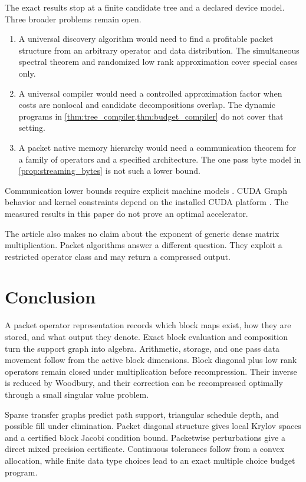 The exact results stop at a finite candidate tree and a declared device model. Three broader problems remain open.

\begin{enumerate}
\item A universal discovery algorithm would need to find a profitable packet structure from an arbitrary operator and data distribution. The simultaneous spectral theorem and randomized low rank approximation cover special cases only.
\item A universal compiler would need a controlled approximation factor when costs are nonlocal and candidate decompositions overlap. The dynamic programs in \cref{thm:tree_compiler,thm:budget_compiler} do not cover that setting.
\item A packet native memory hierarchy would need a communication theorem for a family of operators and a specified architecture. The one pass byte model in \cref{prop:streaming_bytes} is not such a lower bound.
\end{enumerate}

Communication lower bounds require explicit machine models \cite{HongKung1981,BallardDemmelHoltzSchwartz2011}. CUDA Graph behavior and kernel constraints depend on the installed CUDA platform \cite{NVIDIA2026}. The measured results in this paper do not prove an optimal accelerator.

The article also makes no claim about the exponent of generic dense matrix multiplication. Packet algorithms answer a different question. They exploit a restricted operator class and may return a compressed output.

\section{Conclusion}\label{main:section:015}\label{sec:conclusion}

A packet operator representation records which block maps exist, how they are stored, and what output they denote. Exact block evaluation and composition turn the support graph into algebra. Arithmetic, storage, and one pass data movement follow from the active block dimensions. Block diagonal plus low rank operators remain closed under multiplication before recompression. Their inverse is reduced by Woodbury, and their correction can be recompressed optimally through a small singular value problem.

Sparse transfer graphs predict path support, triangular schedule depth, and possible fill under elimination. Packet diagonal structure gives local Krylov spaces and a certified block Jacobi condition bound. Packetwise perturbations give a direct mixed precision certificate. Continuous tolerances follow from a convex allocation, while finite data type choices lead to an exact multiple choice budget program.

